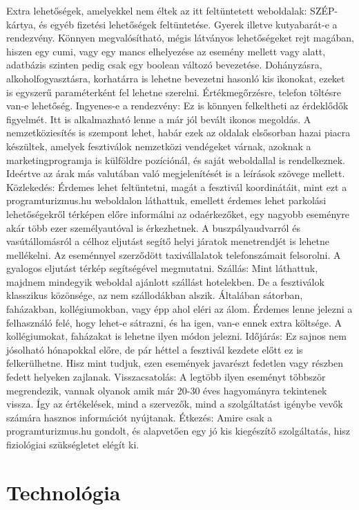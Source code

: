 \documentclass[11pt]{article}
\begin{document}
Extra lehetőségek, amelyekkel nem éltek az itt feltüntetett weboldalak: 
SZÉP-kártya, és egyéb fizetési lehetőségek feltüntetése.
Gyerek illetve kutyabarát-e a rendezvény. Könnyen megvalósítható, mégis látványos lehetőségeket rejt magában, hiszen egy cumi, vagy egy mancs elhelyezése az esemény mellett vagy alatt, adatbázis szinten pedig csak egy boolean változó bevezetése.
Dohányzásra, alkoholfogyasztásra, korhatárra is lehetne bevezetni hasonló kis ikonokat, ezeket is egyszerű paraméterként fel lehetne szerelni.
Értékmegőrzésre, telefon töltésre van-e lehetőség. 
Ingyenes-e a rendezvény: Ez is könnyen felkeltheti az érdeklődők figyelmét. Itt is alkalmazható lenne a már jól bevált ikonos megoldás.
A nemzetköziesítés is szempont lehet, habár ezek az oldalak elsősorban hazai piacra készültek, amelyek fesztiválok nemzetközi vendégeket várnak, azoknak a marketingprogramja is külföldre pozíciónál, és saját weboldallal is rendelkeznek. Ideértve az árak más valutában való megjelenítését is a leírások szövege mellett.
Közlekedés: Érdemes lehet feltüntetni, magát a fesztivál koordinátáit, mint ezt a programturizmus.hu weboldalon láthattuk, emellett érdemes lehet parkolási lehetőségekről térképen előre informálni az odaérkezőket, egy nagyobb eseményre akár több ezer személyautóval is érkezhetnek. A buszpályaudvarról és vasútállomásról a célhoz eljutást segítő helyi járatok menetrendjét is lehetne mellékelni. Az eseménnyel szerződött taxivállalatok telefonszámait felsorolni. A gyalogos eljutást térkép segítségével megmutatni.
Szállás: Mint láthattuk, majdnem mindegyik weboldal ajánlott szállást hotelekben. De a fesztiválok klasszikus közönsége, az nem szállodákban alszik. Általában sátorban, faházakban, kollégiumokban, vagy épp ahol eléri az álom. Érdemes lenne jelezni a felhasználó felé, hogy lehet-e sátrazni, és ha igen, van-e ennek extra költsége. A kollégiumokat, faházakat is lehetne ilyen módon jelezni.
Időjárás: Ez sajnos nem jósolható hónapokkal előre, de pár héttel a fesztivál kezdete előtt ez is felkerülhetne. Hisz mint tudjuk, ezen események javarészt fedetlen vagy részben fedett helyeken zajlanak.
Visszacsatolás: A legtöbb ilyen eseményt többször megrendezik, vannak olyanok amik már 20-30 éves hagyományra tekintenek vissza. Így az értékelések, mind a szervezők, mind a szolgáltatást igénybe vevők számára hasznos információt nyújtanak.
Étkezés: Amire csak a programturizmus.hu gondolt, és alapvetően egy jó kis kiegészítő szolgáltatás, hisz fiziológiai szükségletet elégít ki.

\section{Technológia}
\end{document}
